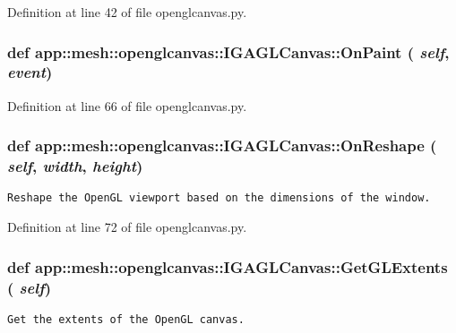 Definition at line 42 of file openglcanvas.py.
\subsubsection{\setlength{\rightskip}{0pt plus 5cm}def app::mesh::openglcanvas::IGAGLCanvas::OnPaint ( {\em self},  {\em event})}\label{classapp_1_1mesh_1_1openglcanvas_1_1IGAGLCanvas_5c19b05c452fa40235e85fc63fbf87a0}




Definition at line 66 of file openglcanvas.py.
\subsubsection{\setlength{\rightskip}{0pt plus 5cm}def app::mesh::openglcanvas::IGAGLCanvas::OnReshape ( {\em self},  {\em width},  {\em height})}\label{classapp_1_1mesh_1_1openglcanvas_1_1IGAGLCanvas_85dd5a15062dcb05ab13c7c549a759a1}




\footnotesize\begin{verbatim}
Reshape the OpenGL viewport based on the dimensions of the window.
\end{verbatim}
\normalsize
 

Definition at line 72 of file openglcanvas.py.
\subsubsection{\setlength{\rightskip}{0pt plus 5cm}def app::mesh::openglcanvas::IGAGLCanvas::GetGLExtents ( {\em self})}\label{classapp_1_1mesh_1_1openglcanvas_1_1IGAGLCanvas_3e250acf3d82c03cad06760669ddd385}




\footnotesize\begin{verbatim}Get the extents of the OpenGL canvas.\end{verbatim}
\normalsize
 


